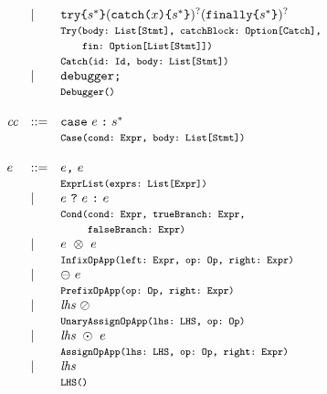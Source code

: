 \[\begin{array}{llll}
& \mid &
{\tt try} \verb+{+\stmt^*\verb+}+ ({\tt catch} \verb+(+\myid\verb+)+ \verb+{+\stmt^*\verb+}+)^? ({\tt finally} \verb+{+\stmt^*\verb+}+)^?\\
&& \mtt{Try(body:~List[Stmt], catchBlock:~Option[Catch],}\\
&& \mtt{\phantom{Try(}fin:~Option[List[Stmt]])}\\
&& \mtt{Catch(id:~Id, body:~List[Stmt])}\\
& \mid & {\tt debugger} \verb+;+ \\
&& \mtt{Debugger()}\\\\

\cc &::=& {\tt case} \ \expr \; \verb+:+ \; \stmt^{*} \\
&& \mtt{Case(cond:~Expr, body:~List[Stmt])}\\\\

\expr &::=& \expr\verb+,+ \ \expr \\
&& \mtt{ExprList(exprs:~List[Expr])}\\
  &\mid& \expr \ \verb+?+ \ \expr \ \verb+:+ \ \expr \\
&& \mtt{Cond(cond:~Expr, trueBranch:~Expr,}\\
&& \mtt{\phantom{Cond(}falseBranch:~Expr)}\\
  &\mid& \expr \ \inop \ \expr \\
&& \mtt{InfixOpApp(left:~Expr, op:~Op, right:~Expr)}\\
  &\mid& \preop \ \expr \\
&& \mtt{PrefixOpApp(op:~Op, right:~Expr)}\\
  &\mid& \lhs \ \postop \\
&& \mtt{UnaryAssignOpApp(lhs:~LHS, op:~Op)}\\
  &\mid& \lhs \ \aop \ \expr \\
&& \mtt{AssignOpApp(lhs:~LHS, op:~Op, right:~Expr)}\\
  &\mid& \lhs \\
&& \mtt{LHS()}\\\\
\end{array}
\]

